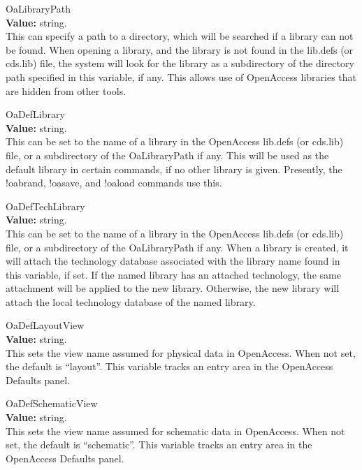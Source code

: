 \begin{description}
\item{\et OaLibraryPath}\\
{\bf Value:} string.\\
This can specify a path to a directory, which will be searched if a
library can not be found.  When opening a library, and the library is
not found in the {\vt lib.defs} (or {\vt cds.lib}) file, the system
will look for the library as a subdirectory of the directory path
specified in this variable, if any.  This allows use of OpenAccess
libraries that are hidden from other tools.

\item{\et OaDefLibrary}\\
{\bf Value:} string.\\
This can be set to the name of a library in the OpenAccess {\vt
lib.defs} (or {\vt cds.lib}) file, or a subdirectory of the {\et
OaLibraryPath} if any.  This will be used as the default library in
certain commands, if no other library is given.  Presently, the {\cb
!oabrand}, {\cb !oasave}, and {\cb !oaload} commands use this. 

\item{\et OaDefTechLibrary}\\
{\bf Value:} string.\\
This can be set to the name of a library in the OpenAccess {\vt
lib.defs} (or {\vt cds.lib}) file, or a subdirectory of the {\et
OaLibraryPath} if any.  When a library is created, it will attach the
technology database associated with the library name found in this
variable, if set.  If the named library has an attached technology,
the same attachment will be applied to the new library.  Otherwise,
the new library will attach the local technology database of the named
library.

\item{\et OaDefLayoutView}\\
{\bf Value:} string.\\
This sets the view name assumed for physical data in OpenAccess.  When
not set, the default is ``{\vt layout}''.  This variable tracks an
entry area in the {\cb OpenAccess Defaults} panel.

\item{\et OaDefSchematicView}\\
{\bf Value:} string.\\
This sets the view name assumed for schematic data in OpenAccess. 
When not set, the default is ``{\vt schematic}''.  This variable
tracks an entry area in the {\cb OpenAccess Defaults} panel.


\end{description}
